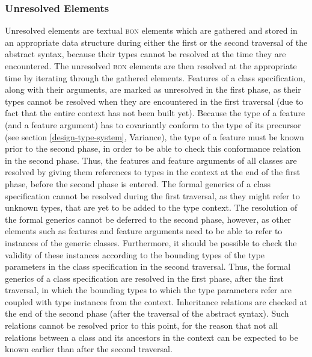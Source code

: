\subsubsection{Unresolved Elements}
\label{implementation-unresolved-elements}
Unresolved elements are textual \textsc{bon} elements which are gathered and stored in an appropriate data structure during either the first or the second traversal of the abstract syntax, because their types cannot be resolved at the time they are encountered. The unresolved \textsc{bon} elements are then resolved at the appropriate time by iterating through the gathered elements.
Features of a class specification, along with their arguments, are marked as unresolved in the first phase, as their types cannot be resolved when they are encountered in the first traversal (due to fact that the entire context has not been built yet). Because the type of a feature (and a feature argument) has to covariantly conform to the type of its precursor (see section \ref{design-type-system}, Variance), the type of a feature must be known prior to the second phase, in order to be able to check this conformance relation in the second phase. Thus, the features and feature arguments of all classes are resolved by giving them references to types in the context at the end of the first phase, before the second phase is entered.
The formal generics 	of a class specification cannot be resolved during the first traversal, as they might refer to unknown types, that are yet to be added to the type context. The resolution of the formal generics cannot be deferred to the second phase, however, as other elements such as features and feature arguments need to be able to refer to instances of the generic classes. Furthermore, it should be possible to check the validity of these instances according to the bounding types of the type parameters in the class specification in the second traversal. Thus, the formal generics of a class specification are resolved in the first phase, after the first traversal, in which the bounding types to which the type parameters refer are coupled with type instances from the context.
Inheritance relations are checked at the end of the second phase (after the traversal of the abstract syntax). Such relations cannot be resolved prior to this point, for the reason that not all relations between a class and its ancestors in the context can be expected to be known earlier than after the second traversal.
